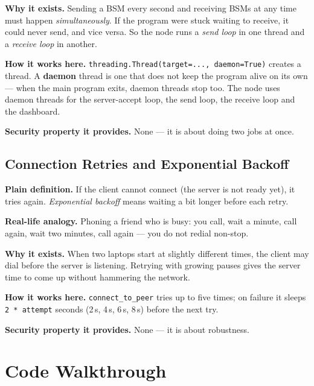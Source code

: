 \documentclass[11pt,a4paper]{report}
\begin{document}
\textbf{Why it exists.} Sending a BSM every second and receiving BSMs at any time
must happen \emph{simultaneously}. If the program were stuck waiting to receive,
it could never send, and vice versa. So the node runs a \emph{send loop} in one
thread and a \emph{receive loop} in another.

\textbf{How it works here.} \texttt{threading.Thread(target=..., daemon=True)}
creates a thread. A \textbf{daemon} thread is one that does not keep the program
alive on its own --- when the main program exits, daemon threads stop too. The
node uses daemon threads for the server-accept loop, the send loop, the receive
loop and the dashboard.

\textbf{Security property it provides.} None --- it is about doing two jobs at once.

\subsection{Connection Retries and Exponential Backoff}
\textbf{Plain definition.} If the client cannot connect (the server is not ready
yet), it tries again. \emph{Exponential backoff} means waiting a bit longer
before each retry.

\textbf{Real-life analogy.} Phoning a friend who is busy: you call, wait a
minute, call again, wait two minutes, call again --- you do not redial
non-stop.

\textbf{Why it exists.} When two laptops start at slightly different times, the
client may dial before the server is listening. Retrying with growing pauses
gives the server time to come up without hammering the network.

\textbf{How it works here.} \texttt{connect\_to\_peer} tries up to five times; on
failure it sleeps \texttt{2 * attempt} seconds (2\,s, 4\,s, 6\,s, 8\,s) before
the next try.

\textbf{Security property it provides.} None --- it is about robustness.

\section{Code Walkthrough}
\end{document}
